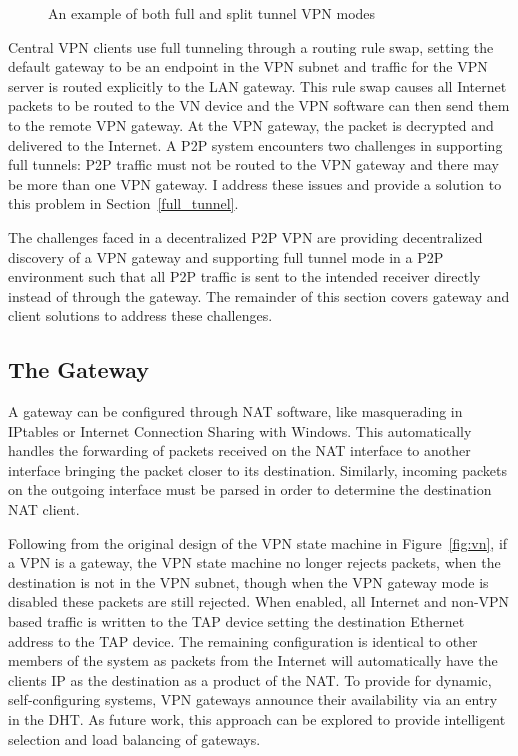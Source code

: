 \begin{figure}
\centering
{}
\caption{An example of both full and split tunnel VPN modes}
\label{fig:tunnel}
\end{figure}

Central VPN clients use full tunneling through a routing rule swap, setting the
default gateway to be an endpoint in the VPN subnet and traffic for the VPN
server is routed explicitly to the LAN gateway.  This rule swap causes all
Internet packets to be routed to the VN device and the VPN software can then
send them to the remote VPN gateway.  At the VPN gateway, the packet is
decrypted and delivered to the Internet.  A P2P system encounters two
challenges in supporting full tunnels:  P2P traffic must not be routed to the
VPN gateway and there may be more than one VPN gateway.  I address these issues
and provide a solution to this problem in Section~\ref{full_tunnel}.

The challenges faced in a decentralized P2P VPN are providing decentralized
discovery of a VPN gateway and supporting full tunnel mode in a P2P environment
such that all P2P traffic is sent to the intended receiver directly instead of
through the gateway.  The remainder of this section covers gateway and
client solutions to address these challenges.

\subsection{The Gateway}
\label{the_gateway}
A gateway can be configured through NAT software, like masquerading in IPtables
or Internet Connection Sharing with Windows.  This automatically handles the
forwarding of packets received on the NAT interface to another interface
bringing the packet closer to its destination.  Similarly, incoming packets
on the outgoing interface must be parsed in order to determine the destination
NAT client.

Following from the original design of the VPN state machine in
Figure~\ref{fig:vn}, if a VPN is a gateway, the VPN state machine no longer
rejects packets, when the destination is not in the VPN subnet, though when the
VPN gateway mode is disabled these packets are still rejected.  When enabled,
all Internet and non-VPN based traffic is written to the TAP device setting the
destination Ethernet address to the TAP device.  The remaining configuration is
identical to other members of the system as packets from the Internet will
automatically have the clients IP as the destination as a product of the NAT.
To provide for dynamic, self-configuring systems, VPN gateways announce their
availability via an entry in the DHT.  As future work, this approach can be
explored to provide intelligent selection and load balancing of gateways.

